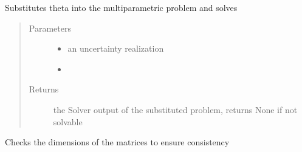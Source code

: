 \documentclass[letterpaper,10pt,english]{sphinxmanual}
\begin{document}
\begin{fulllineitems}
\begin{fulllineitems}
\end{fulllineitems}


\begin{fulllineitems}
\label{\detokenize{ppopt:ppopt.mpqp_program.MPQP_Program.solve_theta}}
\sphinxAtStartPar
Substitutes theta into the multiparametric problem and solves
\begin{quote}\begin{description}
\item[{Parameters}] \leavevmode\begin{itemize}
\item {} 
\sphinxAtStartPar
{} \textendash{} an uncertainty realization

\item {} 
\sphinxAtStartPar
{} \textendash{} 

\end{itemize}

\item[{Returns}] \leavevmode
\sphinxAtStartPar
the Solver output of the substituted problem, returns None if not solvable

\end{description}\end{quote}

\end{fulllineitems}


\begin{fulllineitems}
\label{\detokenize{ppopt:ppopt.mpqp_program.MPQP_Program.warnings}}
\sphinxAtStartPar
Checks the dimensions of the matrices to ensure consistency

\end{fulllineitems}


\end{fulllineitems}
\end{document}
